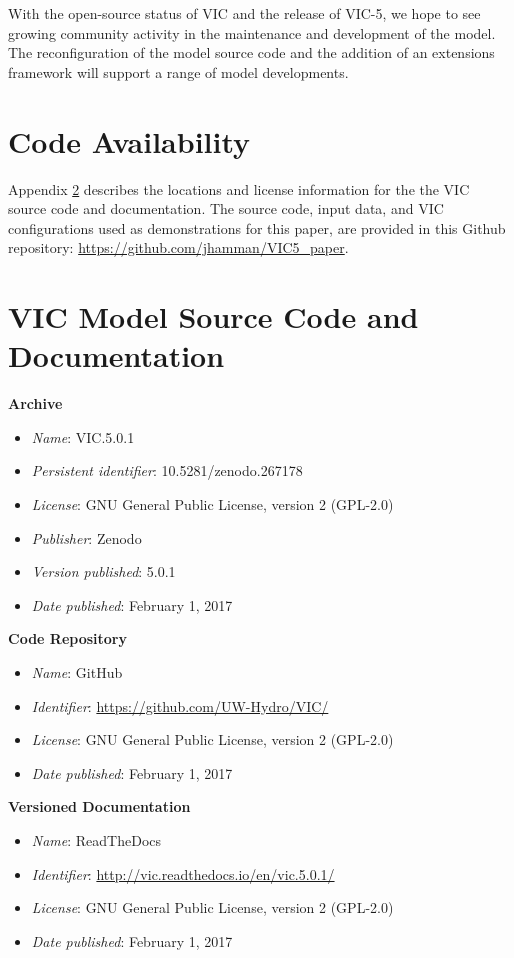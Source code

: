 \documentclass[gmd, manuscript]{copernicus}
\begin{document}
  With the open-source status of VIC and the release of VIC-5, we hope to see growing community activity in the maintenance and development of the model.
  The reconfiguration of the model source code and the addition of an extensions framework will support a range of model developments.

\section{Code Availability}
\label{appendix:code_avail}

  Appendix \ref{appendix:source_code} describes the locations and license information for the the VIC source code and documentation.
  The source code, input data, and VIC configurations used as demonstrations for this paper, are provided in this Github repository: \url{https://github.com/jhamman/VIC5_paper}.

\appendix
\section{VIC Model Source Code and Documentation}
\label{appendix:source_code}
{\bf Archive}

\begin{itemize}
	\item \textit{Name}: VIC.5.0.1
	\item \textit{Persistent identifier}: 10.5281/zenodo.267178
	\item \textit{License}: GNU General Public License, version 2 (GPL-2.0)
	\item \textit{Publisher}:  Zenodo
	\item \textit{Version published}: 5.0.1
	\item \textit{Date published}: February 1, 2017
\end{itemize}

{\bf Code Repository}

\begin{itemize}
	\item \textit{Name}: GitHub
	\item \textit{Identifier}: \url{https://github.com/UW-Hydro/VIC/}
	\item \textit{License}: GNU General Public License, version 2 (GPL-2.0)
	\item \textit{Date published}: February 1, 2017
\end{itemize}

{\bf Versioned Documentation}

\begin{itemize}
	\item \textit{Name}: ReadTheDocs
	\item \textit{Identifier}: \url{http://vic.readthedocs.io/en/vic.5.0.1/}
	\item \textit{License}: GNU General Public License, version 2 (GPL-2.0)
	\item \textit{Date published}: February 1, 2017
\end{itemize}
\end{document}
